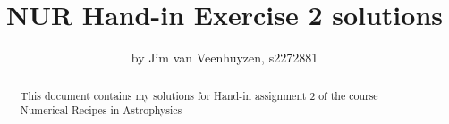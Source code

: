 \documentclass[a4paper,10pt]{article}
\title{NUR Hand-in Exercise 2 solutions}
\author{by Jim van Veenhuyzen, s2272881}
\begin{document}
\maketitle

\begin{abstract}
This document contains my solutions for Hand-in assignment 2 of the course Numerical Recipes in Astrophysics
\end{abstract}



%
\end{document}
